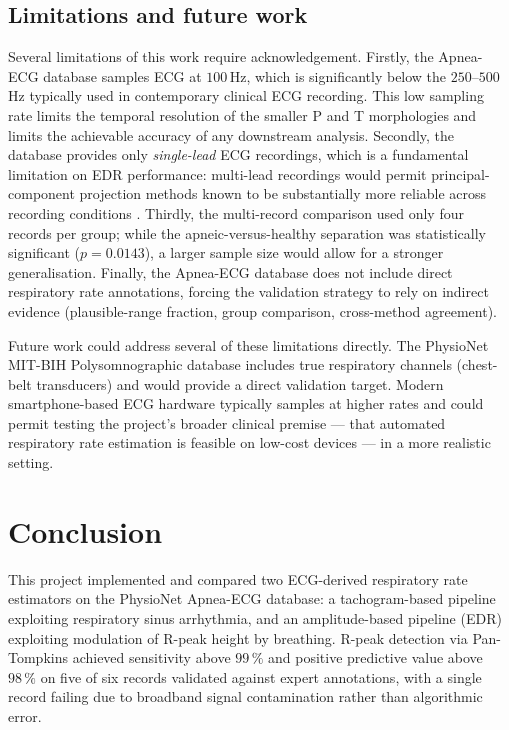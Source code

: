 \documentclass[11pt,a4paper]{article}
\begin{document}
\subsection{Limitations and future work}

Several limitations of this work require acknowledgement. Firstly, the Apnea-ECG database samples ECG at $100$\,Hz, which is significantly below the $250$--$500$\,Hz typically used in contemporary clinical ECG recording. This low sampling rate limits the temporal resolution of the smaller P and T morphologies and limits the achievable accuracy of any downstream analysis. Secondly, the database provides only \textit{single-lead} ECG recordings, which is a fundamental limitation on EDR performance: multi-lead recordings would permit principal-component projection methods known to be substantially more reliable across recording conditions \cite{moody1985derivation}. Thirdly, the multi-record comparison used only four records per group; while the apneic-versus-healthy separation was statistically significant ($p = 0.0143$), a larger sample size would allow for a stronger generalisation. Finally, the Apnea-ECG database does not include direct respiratory rate annotations, forcing the validation strategy to rely on indirect evidence (plausible-range fraction, group comparison, cross-method agreement). 

Future work could address several of these limitations directly. The PhysioNet MIT-BIH Polysomnographic database \cite{goldberger2000physiobank} includes true respiratory channels (chest-belt transducers) and would provide a direct validation target. Modern smartphone-based ECG hardware typically samples at higher rates and could permit testing the project's broader clinical premise --- that automated respiratory rate estimation is feasible on low-cost devices --- in a more realistic setting.

\section{Conclusion}

This project implemented and compared two ECG-derived respiratory rate estimators on the PhysioNet Apnea-ECG database: a tachogram-based pipeline exploiting respiratory sinus arrhythmia, and an amplitude-based pipeline (EDR) exploiting modulation of R-peak height by breathing. R-peak detection via Pan-Tompkins achieved sensitivity above $99\,\%$ and positive predictive value above $98\,\%$ on five of six records validated against expert annotations, with a single record failing due to broadband signal contamination rather than algorithmic error.
\end{document}
